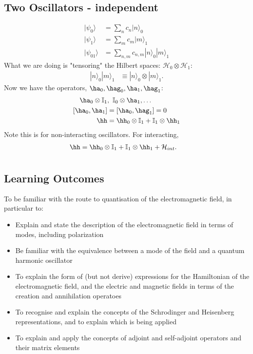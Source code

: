 \documentclass[a4paper, 11pt, normalem]{report}
\begin{document}
\section{Two Oscillators - independent}
\begin{align}
    |\psi_0\rangle &= \sum_n c_n|n\rangle_0 \\
    |\psi_1\rangle &= \sum_m c_m|m\rangle_1 \\
    |\psi_{01}\rangle &= \sum_{n,m} c_{n,m}|n\rangle_0|m\rangle_1
\end{align}
What we are doing is "tensoring" the Hilbert spaces: $\mathcal{H}_0 \otimes \mathcal{H}_1$:
\begin{align}
    |n\rangle_0|m\rangle_1 &\equiv |n\rangle_0\otimes|m\rangle_1.
\end{align}
Now we have the operators, $\ha_0,\hag_0,\ha_1,\hag_1$:
\begin{align}
    \ha_0 \otimes \mathbb{I}_1&,~ \mathbb{I}_0\otimes \ha_1,\dots \\
    [\ha_0,\ha_1] &= [\ha_0,\hag_1] = 0 \\
    \hh &= \hh_0\otimes\mathbb{I}_1 + \mathbb{I}_1\otimes\hh_1 
\end{align}
Note this is for non-interacting oscillators. 
For interacting, 
\begin{align}
    \hh &= \hh_0\otimes\mathbb{I}_1 + \mathbb{I}_1\otimes\hh_1 + \mathcal{H}_{int}.
\end{align}

\chapter{}
\section{Learning Outcomes}
To be familiar with the route to quantisation of the electromagnetic field, in particular to:
\begin{itemize}
    \item Explain and state the description of the electromagnetic field in terms of modes, including polarization
    \item Be familiar with the equivalence between a mode of the field and a quantum harmonic oscillator
    \item To explain the form of (but not derive) expressions for the Hamiltonian of the electromagnetic field, and the electric and magnetic fields in terms of the creation and annihilation operatoes
    \item To recognise and explain the concepts of the Schrodinger and Heisenberg representations, and to explain which is being applied
    \item To explain and apply the concepts of adjoint and self-adjoint operators and their matrix elements
\end{itemize}
\end{document}
